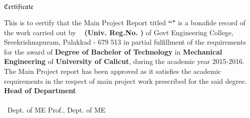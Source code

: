 



\begin{titlepage}


\begin{center}


%
%
%
 \Huge  $ \mathfrak{Certificate}$\\[0.5cm]
%
\end{center}

\quad This is to certify that the Main Project Report titled {\bf ``\vtitle"} is a bonafide record of the work carried out by {\bf \vauthor\ } {\bf (Univ. Reg.No. \vregisternumber) } of Govt Engineering College, Sreekrishnapuram, Palakkad - 679 513 in partial fulfillment of the requirements for the award of  {\bf Degree of Bachelor of Technology} in {\bf Mechanical Engineering} of  {\bf University of Calicut}, during the academic year 2015-2016. The Main Project report has been approved as it satisfies the academic requirements in the respect of main project work prescribed for the said degree.\\[2 cm]
 
 \hfill  {\bf Head of Department} \\[.3cm]
\noindent \vguide \hfill \vhod \\ \vguidedg\ Dept. of ME \hfill Prof., Dept. of ME  



%
\end{titlepage}

%  